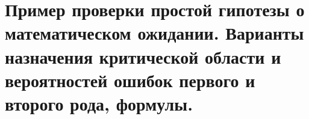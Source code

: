 \documentclass[polytech/stats/exam-2023/stats-exam-2023.tex]{subfiles}
\begin{document}
\section{Пример проверки простой гипотезы о математическом ожидании. Варианты назначения критической области и вероятностей ошибок первого и второго рода, формулы.}
\end{document}
